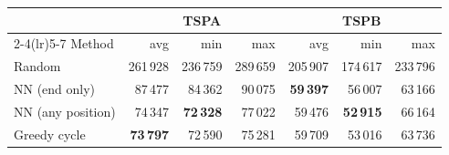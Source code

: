 \begin{tabular}{lrrrrrr}
\toprule
 & \multicolumn{3}{c}{TSPA} & \multicolumn{3}{c}{TSPB} \\
\cmidrule(lr){2-4}\cmidrule(lr){5-7}
Method & avg & min & max & avg & min & max \\
\midrule
Random & 261\,928 & 236\,759 & 289\,659 & 205\,907 & 174\,617 & 233\,796 \\
NN (end only) & 87\,477 & 84\,362 & 90\,075 & \textbf{59\,397} & 56\,007 & 63\,166 \\
NN (any position) & 74\,347 & \textbf{72\,328} & 77\,022 & 59\,476 & \textbf{52\,915} & 66\,164 \\
Greedy cycle & \textbf{73\,797} & 72\,590 & 75\,281 & 59\,709 & 53\,016 & 63\,736 \\
\bottomrule
\end{tabular}
